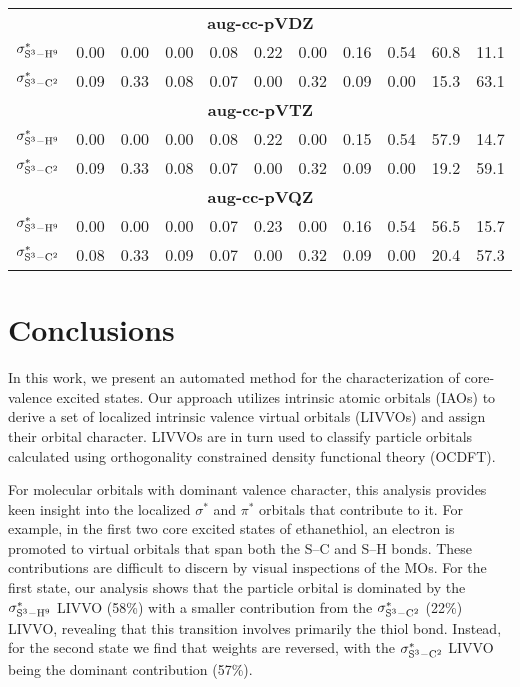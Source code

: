 \documentclass{article}
\begin{document}
\begin{table*}[!t]
\begin{tabular}{@{\extracolsep{6pt}}ccccccccccc@{}}
\multicolumn{11}{c}{\bf{aug-cc-pVDZ}} \\
$\sigma^*_{\rm S^3-H^9} $& 0.00 & 0.00 & 0.00 & 0.08 & 0.22 & 0.00 & 0.16 & 0.54 & 60.8 &  11.1\\
$\sigma^*_{\rm S^3-C^2} $& 0.09 & 0.33 & 0.08 & 0.07 & 0.00 & 0.32 & 0.09 & 0.00 & 15.3 & 63.1\\
\multicolumn{11}{c}{\bf{aug-cc-pVTZ}} \\
$\sigma^*_{\rm S^3-H^9} $& 0.00 & 0.00 & 0.00 & 0.08 & 0.22 & 0.00 & 0.15 & 0.54 & 57.9 &  14.7\\
$\sigma^*_{\rm S^3-C^2} $& 0.09 & 0.33 & 0.08 & 0.07 & 0.00 & 0.32 & 0.09 & 0.00 & 19.2 & 59.1\\
\multicolumn{11}{c}{\bf{aug-cc-pVQZ}} \\
$\sigma^*_{\rm S^3-H^9}$ & 0.00 & 0.00 & 0.00 & 0.07 & 0.23 & 0.00 & 0.16 & 0.54 & 56.5 & 15.7\\
$\sigma^*_{\rm S^3-C^2}$ & 0.08 & 0.33 & 0.09 & 0.07 & 0.00 & 0.32 & 0.09 & 0.00 & 20.4 & 57.3\\
\bottomrule
 \end{tabular}
 \label{tab:basis_compare}
 \end{table*}


\section{Conclusions}
In this work, we present an automated method for the characterization of core-valence excited states.
Our approach utilizes intrinsic atomic orbitals (IAOs) to derive a set of localized intrinsic valence virtual orbitals (LIVVOs) and assign their orbital character.
LIVVOs are in turn used to classify particle orbitals calculated using orthogonality constrained density functional theory (OCDFT).

For molecular orbitals with dominant valence character, this analysis provides keen insight into the localized $\sigma^*$  and $\pi^*$ orbitals that contribute to it.
For example, in the first two core excited states of ethanethiol, an electron is promoted to virtual orbitals that span both the S--C and S--H bonds. These contributions are difficult to discern by visual inspections of the MOs.
For the first state, our analysis shows that the particle orbital is dominated by the $\sigma^*_{\rm S^3-H^9}$ LIVVO (58\%) with a smaller contribution from the $\sigma^*_{\rm S^3-C^2}$ (22\%) LIVVO, revealing that this transition involves primarily the thiol bond.
Instead, for the second state we find that weights are reversed, with the $\sigma^*_{\rm S^3-C^2}$ LIVVO being the dominant contribution (57\%).
\end{document}

